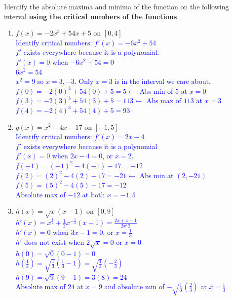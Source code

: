 \documentclass{ximera}
\begin{document}
\begin{exercise}
    Identify the absolute maxima and minima of the function on the following interval \textbf{using the critical numbers of the functions}.
    \begin{enumerate}
        \item $f(x)=-2x^3+54x+5$ on $[0,4]$\\
        \textcolor{blue}{ Identify critical numbers: $f'(x)=-6x^2+54$\\
        $f'$ exists everywhere because it is a polynomial.\\
        $f'(x)=0$ when $-6x^2+54=0$\\
        $6x^2=54$\\
        $x^2=9$ so $x=3, -3$.  Only $x=3$ is in the interval we care about.\\
        $f(0)=-2(0)^3+54(0)+5=5 \leftarrow $ Abs min of $5$ at $x=0$\\
        $f(3)=-2(3)^3+54(3)+5=113 \leftarrow$ Abs max of $113$ at $x=3$\\
        $f(4)=-2(4)^3+54(4)+5=93$}
        
        \item $g(x)=x^2-4x-17$ on $[-1,5]$\\
        \textcolor{blue}{ Identify critical numbers: $f'(x)=2x-4$\\
        $f'$ exists everywhere because it is a polynomial\\
        $f'(x)=0$ when $2x-4=0$, or $x=2$.\\
        $f(-1)=(-1)^2-4(-1)-17=-12$\\
        $f(2)=(2)^2-4(2)-17=-21\leftarrow$ Abs min at $(2,-21)$\\
        $f(5)=(5)^2-4(5)-17=-12$\\
        Absolute max of $-12$ at both $x=-1, 5$}
        
        \item $h(x)=\sqrt{x}(x-1)$ on $[0,9]$\\
        \textcolor{blue}{ $h'(x)=x^{\frac{1}{2}}+\frac{1}{2}x^{-\frac{1}{2}}(x-1)=\frac{2x+x-1}{2x^{1}{2}}$\\
        $h'(x)=0$ when $3x-1=0$, or $x=\frac13$\\
        $h'$ does not exist when $2\sqrt{x}=0$ or $x=0$\\
        $h(0)=\sqrt{0}(0-1)=0$\\
        $h(\frac{1}{3})=\sqrt{\frac{1}{3}}(\frac{1}{3}-1)=\sqrt{\frac{1}{3}}(-\frac23)$\\
        $h(9)=\sqrt{9}(9-1)=3(8)=24$\\
        Absolute max of $24$ at $x=9$ and absolute min of $-\sqrt{\frac13}(\frac23)$ at $x=\frac{1}{3}$}
    \end{enumerate}
\end{exercise}
\end{document}
